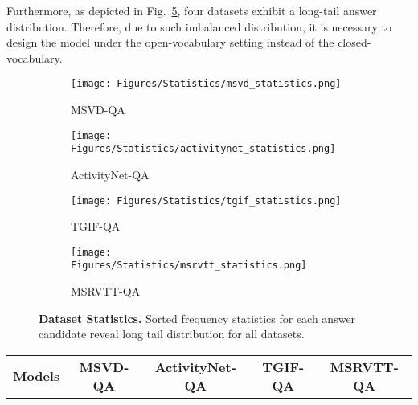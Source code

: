 \documentclass[10pt,twocolumn,letterpaper]{article}
\begin{document}
Furthermore, as depicted in Fig.~\ref{fig:longtail}, four datasets exhibit a long-tail answer distribution. 
Therefore, due to such imbalanced distribution, it is necessary to design the model under the open-vocabulary setting instead of the closed-vocabulary. \begin{figure}[t] 
    \centering
    \begin{subfigure}[t]{0.45\linewidth}
        \texttt{[image: Figures/Statistics/msvd\_statistics.png]}
        \caption{MSVD-QA}
        \label{fig:msvd_tail}
    \end{subfigure}
    \begin{subfigure}[t]{0.45\linewidth}
        \texttt{[image: Figures/Statistics/activitynet\_statistics.png]}
        \caption{ActivityNet-QA}
        
        \label{fig:activitynet_tail}
    \end{subfigure}
        \begin{subfigure}[t]{0.45\linewidth}
        \texttt{[image: Figures/Statistics/tgif\_statistics.png]}
        \caption{TGIF-QA}
        \label{fig:tgif_tail}
    \end{subfigure}
    \begin{subfigure}[t]{0.45\linewidth}
        \texttt{[image: Figures/Statistics/msrvtt\_statistics.png]}
        \caption{MSRVTT-QA}
        
        \label{fig:msrvtt_tail}
    \end{subfigure}
    \caption{\textbf{Dataset Statistics.}
    Sorted frequency statistics for each answer candidate reveal long tail distribution for all datasets.
    }
    \label{fig:longtail}
\end{figure} \begin{table*}[t!]
    \centering
    \setlength{\tabcolsep}{3.5pt}
    \begin{adjustbox}{width=\linewidth}
    \begin{tabular}{c| c c c c c c | c c c c c c | c c c c c c | c c c c c c }
        \toprule
        \textbf{Models} & \multicolumn{6}{c|}{\textbf{MSVD-QA}} & \multicolumn{6}{c|}{\textbf{ActivityNet-QA}} & \multicolumn{6}{c|}{\textbf{TGIF-QA}} & \multicolumn{6}{c}{\textbf{MSRVTT-QA}} \\


\end{tabular}
\end{adjustbox}
\end{table*}
\end{document}
